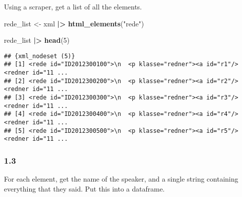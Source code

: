 \documentclass[
]{article}
\newenvironment{Shaded}{\begin{snugshade}}{\end{snugshade}}
\newcommand{\DecValTok}[1]{\textcolor[rgb]{0.00,0.00,0.81}{#1}}
\newcommand{\FunctionTok}[1]{\textcolor[rgb]{0.13,0.29,0.53}{\textbf{#1}}}
\newcommand{\NormalTok}[1]{#1}
\newcommand{\OtherTok}[1]{\textcolor[rgb]{0.56,0.35,0.01}{#1}}
\newcommand{\SpecialCharTok}[1]{\textcolor[rgb]{0.81,0.36,0.00}{\textbf{#1}}}
\newcommand{\StringTok}[1]{\textcolor[rgb]{0.31,0.60,0.02}{#1}}
\begin{document}
Using a scraper, get a list of all the elements.

\begin{Shaded}
\begin{Highlighting}[]
\NormalTok{rede\_list }\OtherTok{\textless{}{-}}\NormalTok{ xml }\SpecialCharTok{|\textgreater{}} 
  \FunctionTok{html\_elements}\NormalTok{(}\StringTok{"rede"}\NormalTok{)}

\NormalTok{rede\_list }\SpecialCharTok{|\textgreater{}} 
  \FunctionTok{head}\NormalTok{(}\DecValTok{5}\NormalTok{)}
\end{Highlighting}
\end{Shaded}

\begin{verbatim}
## {xml_nodeset (5)}
## [1] <rede id="ID2012300100">\n  <p klasse="redner"><a id="r1"/><redner id="11 ...
## [2] <rede id="ID2012300200">\n  <p klasse="redner"><a id="r2"/><redner id="11 ...
## [3] <rede id="ID2012300300">\n  <p klasse="redner"><a id="r3"/><redner id="11 ...
## [4] <rede id="ID2012300400">\n  <p klasse="redner"><a id="r4"/><redner id="11 ...
## [5] <rede id="ID2012300500">\n  <p klasse="redner"><a id="r5"/><redner id="11 ...
\end{verbatim}

\hypertarget{section-2}{%
\subsubsection{1.3}\label{section-2}}

For each element, get the name of the speaker, and a single string
containing everything that they said. Put this into a dataframe.
\end{document}
